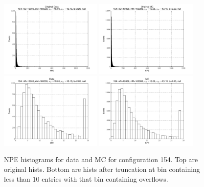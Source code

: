  \begin{figure}[htbp] \begin{center} 
\includegraphics[width=0.45\textwidth]{../FIGURES/154/FIG_Original_Data.pdf} 
\includegraphics[width=0.45\textwidth]{../FIGURES/154/FIG_Original_MC.pdf} 
\includegraphics[width=0.45\textwidth]{../FIGURES/154/FIG_Data.pdf} 
\includegraphics[width=0.45\textwidth]{../FIGURES/154/FIG_MC.pdf} 
\caption{NPE histograms for data and MC for configuration 154. Top are original hists. Bottom are hists after truncation at bin containing less than 10 entries with that bin containing overflows.} 
\label{tab:npe_154} 
\end{center} \end{figure} 
\clearpage
 